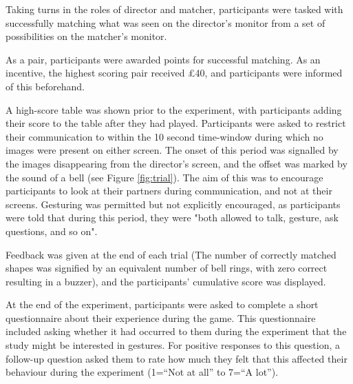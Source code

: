 \documentclass[a4paper,man,natbib]{apa6}
\begin{document}
Taking turns in the roles of director and matcher, participants were tasked with successfully matching what was seen on the director's monitor from a set of possibilities on the matcher's monitor.

As a pair, participants were awarded points for successful matching.
As an incentive, the highest scoring pair received \pounds 40, and participants were informed of this beforehand.

A high-score table was shown prior to the experiment, with participants adding their score to the table after they had played.
Participants were asked to restrict their communication to within the 10 second time-window during which no images were present on either screen. 
The onset of this period was signalled by the images disappearing from the director's screen, and the offset was marked by the sound of a bell (see Figure \ref{fig:trial}).
The aim of this was to encourage participants to look at their partners during communication, and not at their screens. 
Gesturing was permitted but not explicitly encouraged, as participants were told that during this period, they were "both allowed to talk, gesture, ask questions, and so on".

Feedback was given at the end of each trial (The number of correctly matched shapes was signified by an equivalent number of bell rings, with zero correct resulting in a buzzer), and the participants' cumulative score was displayed.

At the end of the experiment, participants were asked to complete a short questionnaire about their experience during the game.
This questionnaire included asking whether it had occurred to them during the experiment that the study might be interested in gestures.
For positive responses to this question, a follow-up question asked them to rate how much they felt that this affected their behaviour during the experiment (1=``Not at all'' to 7=``A lot'').
\end{document}
